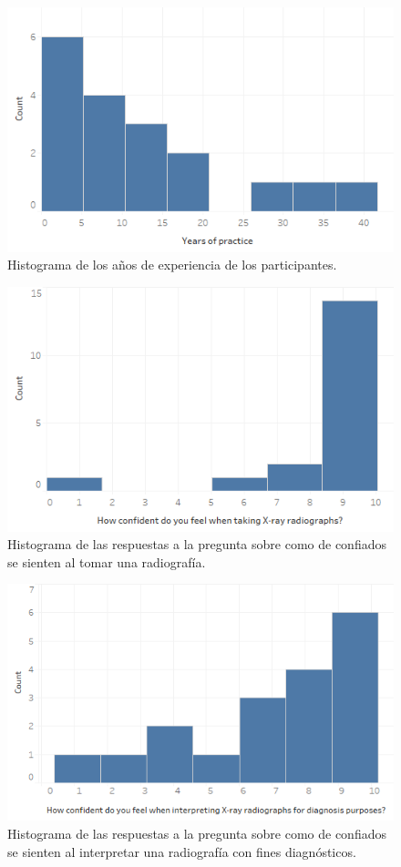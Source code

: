 \begin{figure}[h]
        \centering
        \includegraphics[width=0.75\linewidth]{IMG/years.png}
        {
         \caption{\label{fig:year}Histograma de los años de experiencia de los participantes.}
        }
       
    \end{figure}
     \begin{figure}[h]
        \centering
        \includegraphics[width=0.75\linewidth]{IMG/confident.png}{
        
        \caption{\label{fig:confident}Histograma de las respuestas a la pregunta sobre como de confiados se sienten al tomar una radiografía.}
        }
    \end{figure}
   
     \begin{figure}[h]
        \centering
        \includegraphics[width=0.75\linewidth]{IMG/interpreting.png}{
        \caption{\label{fig:interpreting}Histograma de las respuestas a la pregunta sobre como de confiados se sienten al interpretar una radiografía con fines diagnósticos.}
        }
    \end{figure}


